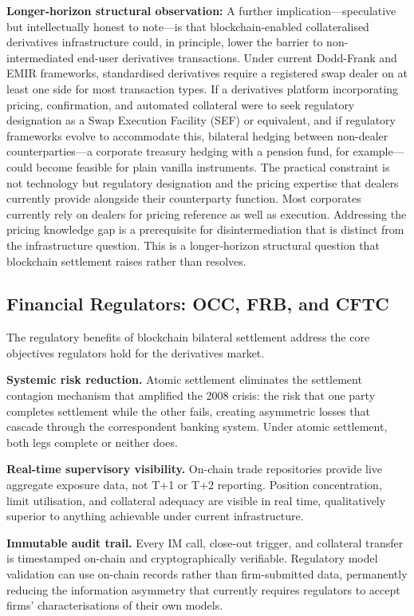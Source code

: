 \documentclass[12pt,letterpaper]{article}
\numberwithin{equation}{section}
\theoremstyle{remark}
\begin{document}
\textbf{Longer-horizon structural observation:}
A further implication---speculative but intellectually honest to note---is
that blockchain-enabled collateralised derivatives infrastructure could, in
principle, lower the barrier to non-intermediated end-user derivatives
transactions. Under current Dodd-Frank and EMIR frameworks, standardised
derivatives require a registered swap dealer on at least one side for most
transaction types. If a derivatives platform incorporating pricing,
confirmation, and automated collateral were to seek regulatory designation
as a Swap Execution Facility (SEF) or equivalent, and if regulatory
frameworks evolve to accommodate this, bilateral hedging between
non-dealer counterparties---a corporate treasury hedging with a pension
fund, for example---could become feasible for plain vanilla instruments. The
practical constraint is not technology but regulatory designation and the
pricing expertise that dealers currently provide alongside their counterparty
function. Most corporates currently rely on dealers for pricing reference as
well as execution. Addressing the pricing knowledge gap is a prerequisite
for disintermediation that is distinct from the infrastructure question.
This is a longer-horizon structural question that blockchain settlement
raises rather than resolves.

\subsection{Financial Regulators: OCC, FRB, and CFTC}

The regulatory benefits of blockchain bilateral settlement address the core
objectives regulators hold for the derivatives market.

\textbf{Systemic risk reduction.} Atomic settlement eliminates the
settlement contagion mechanism that amplified the 2008 crisis: the risk
that one party completes settlement while the other fails, creating
asymmetric losses that cascade through the correspondent banking system.
Under atomic settlement, both legs complete or neither does.

\textbf{Real-time supervisory visibility.} On-chain trade repositories
provide live aggregate exposure data, not T+1 or T+2 reporting. Position
concentration, limit utilisation, and collateral adequacy are visible in
real time, qualitatively superior to anything achievable under current
infrastructure.

\textbf{Immutable audit trail.} Every IM call, close-out trigger, and
collateral transfer is timestamped on-chain and cryptographically verifiable.
Regulatory model validation can use on-chain records rather than
firm-submitted data, permanently reducing the information asymmetry that
currently requires regulators to accept firms' characterisations of their
own models.
\end{document}
